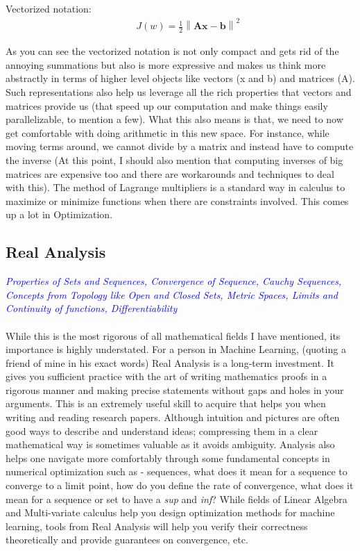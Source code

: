 \documentclass[a4paper]{article}
\begin{document}
Vectorized notation:
\begin{equation} \label{eq:5}
\begin{aligned}
& & J(w) = \frac{1}{2} \left\lVert \mathbf{A} \boldsymbol{x} - \boldsymbol{b} \right\rVert ^2
\end{aligned}
\end{equation}

\noindent As you can see the vectorized notation is not only compact and gets rid of the annoying summations but also is more expressive and makes us think more abstractly in terms of higher level objects like vectors (x and b) and matrices (A). Such representations also help us leverage all the rich properties that vectors and matrices provide us (that speed up our computation and make things easily parallelizable, to mention a few). What this also means is that, we need to now get comfortable with doing arithmetic in this new space. For instance, while moving terms around, we cannot divide by a matrix and instead have to compute the inverse (At this point, I should also mention that computing inverses of big matrices are expensive too and there are workarounds and techniques to deal with this). The method of Lagrange multipliers is a standard way in calculus to maximize or minimize functions when there are constraints involved. This comes up a lot in Optimization. \\

\subsection{Real Analysis}
\textcolor{blue}{\textit{Properties of Sets and Sequences, Convergence of Sequence, Cauchy Sequences, Concepts from Topology like Open and Closed Sets, Metric Spaces, Limits and Continuity of functions, Differentiability}} \\ \\
While this is the most rigorous of all mathematical fields I have mentioned, its importance is highly understated. For a person in Machine Learning, (quoting a friend of mine in his exact words) Real Analysis is a long-term investment. It gives you sufficient practice with the art of writing mathematics proofs in a rigorous manner and making precise statements without gaps and holes in your arguments. This is an extremely useful skill to acquire that helps you when writing and reading research papers. Although intuition and pictures are often good ways to describe and understand ideas; compressing them in a clear mathematical way is sometimes valuable as it avoids ambiguity. Analysis also helps one navigate more comfortably through some fundamental concepts in numerical optimization such as - sequences, what does it mean for a sequence to converge to a limit point, how do you define the rate of convergence, what does it mean for a sequence or set to have a \textit{sup} and \textit{inf}? While fields of Linear Algebra and Multi-variate calculus help you design optimization methods for machine learning, tools from Real Analysis will help you verify their correctness theoretically and provide guarantees on convergence, etc. \\
\end{document}
